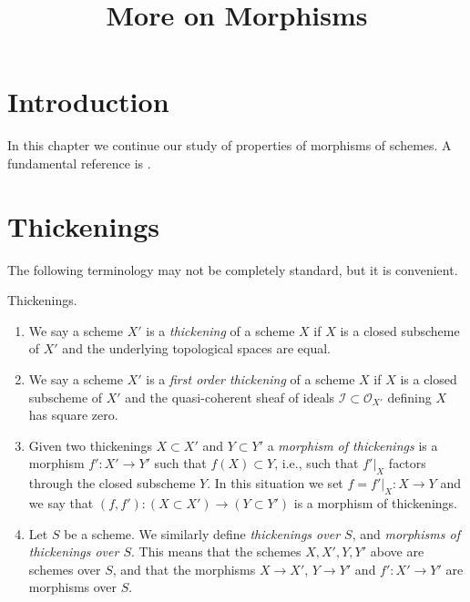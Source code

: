 

%


\title{More on Morphisms}


\maketitle

\label{section-phantom}

\tableofcontents

\section{Introduction}
\label{section-introduction}

\noindent
In this chapter we continue our study of properties of morphisms of schemes.
A fundamental reference is \cite{EGA}.






\section{Thickenings}
\label{section-thickenings}

\noindent
The following terminology may not be completely standard, but it is convenient.

\begin{definition}
\label{definition-thickening}
Thickenings.
\begin{enumerate}
\item We say a scheme $X'$ is a {\it thickening} of a scheme $X$ if
$X$ is a closed subscheme of $X'$ and the underlying topological spaces
are equal.
\item We say a scheme $X'$ is a {\it first order thickening} of a scheme $X$ if
$X$ is a closed subscheme of $X'$ and the quasi-coherent sheaf of ideals
$\mathcal{I} \subset \mathcal{O}_{X'}$ defining $X$ has square zero.
\item Given two thickenings $X \subset X'$ and $Y \subset Y'$ a
{\it morphism of thickenings} is a morphism $f' : X' \to Y'$ such that
$f(X) \subset Y$, i.e., such that $f'|_X$ factors through the closed
subscheme $Y$. In this situation we set $f = f'|_X : X \to Y$ and we say
that $(f, f') : (X \subset X') \to (Y \subset Y')$ is a morphism of
thickenings.
\item Let $S$ be a scheme. We similarly define {\it thickenings over $S$}, and
{\it morphisms of thickenings over $S$}. This means that the schemes
$X, X', Y, Y'$ above are schemes over $S$, and that the morphisms
$X \to X'$, $Y \to Y'$ and $f' : X' \to Y'$ are morphisms over $S$.
\end{enumerate}
\end{definition}

